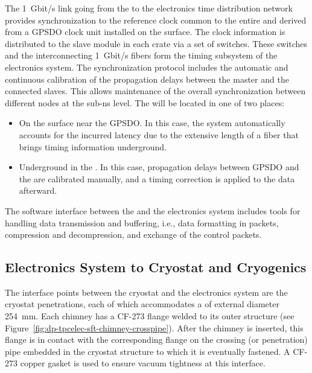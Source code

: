 The \SI{1}{Gbit/s} link going from the  to the  electronics time distribution network provides synchronization to the reference clock common %
to the entire  and derived from a GPSDO clock unit installed on the surface. The clock information is distributed to the  slave module in each  crate via a set of  switches. These switches and the interconnecting \SI{1}{Gbit/s} fibers form the timing subsystem of the  electronics system. %
The  synchronization protocol includes the automatic and continuous calibration of the propagation delays between the master and the connected slaves. This allows maintenance of the  overall synchronization between different nodes at the sub-ns level. The  will be located in one of two places:
\begin{itemize}
\item{On the surface near the GPSDO. In this case, the system automatically accounts for the incurred latency due to the extensive length of a fiber that brings timing information underground.}
\item{Underground in the . In this case, propagation delays between GPSDO and the  are calibrated manually, and a timing correction is applied to the data afterward.}
\end{itemize} 



The software interface between the  and the electronics system includes tools for handling data transmission and buffering, i.e.,  data formatting in  packets, compression and decompression, and exchange of the control packets.

\subsection{Electronics System to Cryostat and Cryogenics}
\label{ssec:dp-tpcelec-intfc-cryo}

The interface points between the cryostat and the  electronics system %
are the cryostat penetrations, each of which %
accommodates a %
 of external diameter \SI{254}{\mm}. Each chimney has a CF-273 flange welded to its outer structure (see Figure~\ref{fig:dp-tpcelec-sft-chimney-crosspipe}). After the chimney is inserted, this flange is in contact with the corresponding flange on the crossing (or penetration) pipe embedded in the cryostat structure to which it is eventually fastened. %
A CF-273 copper gasket is used to ensure vacuum tightness at this interface.  

